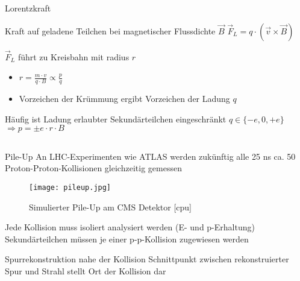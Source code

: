 \begin{frame}{Lorentzkraft}
	\begin{block}{Kraft auf geladene Teilchen bei magnetischer Flussdichte
	$\vec{B}$}
		$\vec{F}_L = q \cdot (\vec{v} \times \vec{B})$
	\end{block}
	\begin{block}{$\vec{F}_L$ führt zu Kreisbahn mit radius $r$}
		\begin{itemize}\setlength{\itemsep}{+5pt}
		  \item $r = \frac{m \cdot v}{q \cdot B} \propto \frac{p}{q}$
		  \item Vorzeichen der Krümmung ergibt Vorzeichen der Ladung $q$
		\end{itemize}
	\end{block}
	\begin{exampleblock}{Häufig ist Ladung erlaubter Sekundärteilchen eingeschränkt}
		$q \in \{- e, 0, +e\}$
		$\Rightarrow p = \pm e \cdot r \cdot B$
	\end{exampleblock}
\end{frame}

\subsection[]{}


\begin{frame}{Pile-Up}
	An LHC-Experimenten wie ATLAS werden zukünftig alle 25 ns ca. 50
	Proton-Proton-Kollisionen gleichzeitig gemessen
	\begin{figure}[htp]
	\begin{center}
	  \texttt{[image: pileup.jpg]}
	  \caption{Simulierter Pile-Up am CMS Detektor [cpu]}
	\end{center}
	\end{figure}
	\vspace{-0.7cm}
	\begin{block}{Jede Kollision muss isoliert analysiert werden (E- und
	p-Erhaltung)} Sekundärteilchen müssen je einer p-p-Kollision zugewiesen werden 
	\end{block}
	\begin{exampleblock}{Spurrekonstruktion nahe der Kollision}
		Schnittpunkt zwischen rekonstruierter Spur und Strahl stellt Ort der Kollision
		dar
	\end{exampleblock}
\end{frame}



